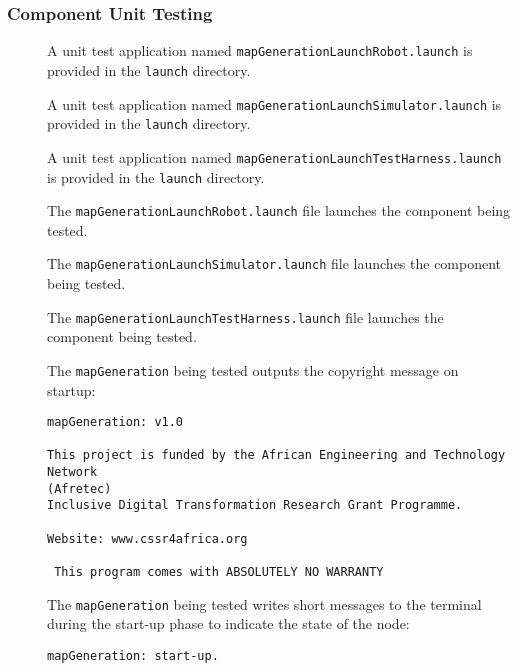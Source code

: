 \documentclass{CSSRforAfrica}
\newcommand{\checkboxChecked}{\fbox{\ding{51}}} %
\newcommand{\checkboxDashed}{\fbox{--}}         %
\begin{document}
\subsubsection{Component Unit Testing}
\label{subsubsection:map_generation_unit_testing}


\begin{description}
\item[\checkboxDashed] A unit test application named {\small \verb+mapGenerationLaunchRobot.launch+} is provided in the {\small \verb+launch+} directory. 

\item[\checkboxDashed] A unit test application named {\small \verb+mapGenerationLaunchSimulator.launch+} is provided in the {\small \verb+launch+} directory. 

\item[\checkboxDashed] A unit test application named {\small \verb+mapGenerationLaunchTestHarness.launch+} is provided in the {\small \verb+launch+} directory. 

\item[\checkboxDashed] The {\small \verb+mapGenerationLaunchRobot.launch+} file  launches the component being tested.

\item[\checkboxDashed] The {\small \verb+mapGenerationLaunchSimulator.launch+} file  launches the component being tested.

\item[\checkboxDashed] The {\small \verb+mapGenerationLaunchTestHarness.launch+} file  launches the component being tested.

\item[\checkboxChecked]  The {\small \verb+mapGeneration+} being tested outputs the copyright message on startup:
\begin{verbatim}
mapGeneration: v1.0
 
This project is funded by the African Engineering and Technology Network 
(Afretec) 
Inclusive Digital Transformation Research Grant Programme.
 
Website: www.cssr4africa.org
 
 This program comes with ABSOLUTELY NO WARRANTY
\end{verbatim}

\item[\checkboxChecked]  The {\small \verb+mapGeneration+} being tested writes short messages to the terminal during the start-up phase to indicate the state of the node:
\begin{verbatim}
mapGeneration: start-up.
\end{verbatim}


\end{description}
\end{document}
